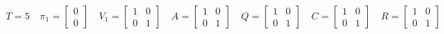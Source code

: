\documentclass{standalone}
\begin{document}
    \( \displaystyle
        T = 5 \quad
        \pi_1 = \begin{bmatrix} 0 \\ 0 \end{bmatrix} \quad
        V_1 = \begin{bmatrix} 1 & 0 \\ 0 & 1 \end{bmatrix} \quad
        A = \begin{bmatrix} 1 & 0 \\ 0 & 1 \end{bmatrix} \quad
        Q = \begin{bmatrix} 1 & 0 \\ 0 & 1 \end{bmatrix} \quad
        C = \begin{bmatrix} 1 & 0 \\ 0 & 1 \end{bmatrix} \quad
        R = \begin{bmatrix} 1 & 0 \\ 0 & 1 \end{bmatrix}
    \)
\end{document}
